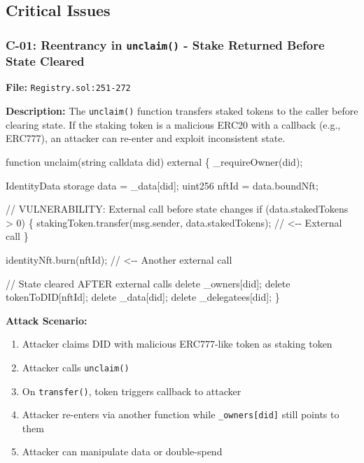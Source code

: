 \documentclass[
]{article}
\newenvironment{Shaded}{}{}
\newcommand{\NormalTok}[1]{#1}
\providecommand{\tightlist}{%
  \setlength{\itemsep}{0pt}\setlength{\parskip}{0pt}}
\begin{document}
\subsection{Critical Issues}\label{critical-issues}

\subsubsection{\texorpdfstring{C-01: Reentrancy in \texttt{unclaim()} -
Stake Returned Before State
Cleared}{C-01: Reentrancy in unclaim() - Stake Returned Before State Cleared}}\label{c-01-reentrancy-in-unclaim---stake-returned-before-state-cleared}

\textbf{File:} \texttt{Registry.sol:251-272}

\textbf{Description:} The \texttt{unclaim()} function transfers staked
tokens to the caller before clearing state. If the staking token is a
malicious ERC20 with a callback (e.g., ERC777), an attacker can re-enter
and exploit inconsistent state.

\begin{Shaded}
\begin{Highlighting}[]
\NormalTok{function unclaim(string calldata did) external \{}
\NormalTok{    \_requireOwner(did);}

\NormalTok{    IdentityData storage data = \_data[did];}
\NormalTok{    uint256 nftId = data.boundNft;}

\NormalTok{    // VULNERABILITY: External call before state changes}
\NormalTok{    if (data.stakedTokens \textgreater{} 0) \{}
\NormalTok{        stakingToken.transfer(msg.sender, data.stakedTokens);  // \textless{}{-}{-} External call}
\NormalTok{    \}}

\NormalTok{    identityNft.burn(nftId);  // \textless{}{-}{-} Another external call}

\NormalTok{    // State cleared AFTER external calls}
\NormalTok{    delete \_owners[did];}
\NormalTok{    delete tokenToDID[nftId];}
\NormalTok{    delete \_data[did];}
\NormalTok{    delete \_delegatees[did];}
\NormalTok{\}}
\end{Highlighting}
\end{Shaded}

\textbf{Attack Scenario:}

\begin{enumerate}
\def\labelenumi{\arabic{enumi}.}
\tightlist
\item
  Attacker claims DID with malicious ERC777-like token as staking token
\item
  Attacker calls \texttt{unclaim()}
\item
  On \texttt{transfer()}, token triggers callback to attacker
\item
  Attacker re-enters via another function while
  \texttt{\_owners{[}did{]}} still points to them
\item
  Attacker can manipulate data or double-spend
\end{enumerate}
\end{document}
